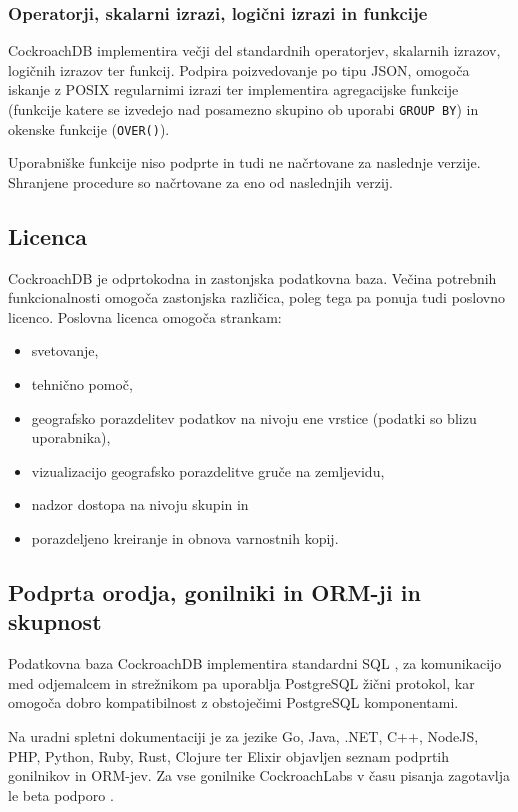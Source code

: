 \documentclass[a4paper, 12pt]{book}
\begin{document}
\subsubsection{Operatorji, skalarni izrazi, logični izrazi in funkcije}
CockroachDB implementira večji del standardnih operatorjev, skalarnih izrazov, logičnih izrazov ter funkcij. Podpira poizvedovanje po tipu JSON, omogoča iskanje z POSIX regularnimi izrazi ter implementira agregacijske funkcije (funkcije katere se izvedejo nad posamezno skupino ob uporabi \texttt{GROUP BY}) in okenske funkcije (\texttt{OVER()}).

Uporabniške funkcije niso podprte in tudi ne načrtovane za naslednje verzije. Shranjene procedure so načrtovane za eno od naslednjih verzij.

\subsection{Licenca}

CockroachDB je odprtokodna in zastonjska podatkovna baza. Večina potrebnih funkcionalnosti omogoča zastonjska različica, poleg tega pa ponuja tudi poslovno licenco. Poslovna licenca omogoča strankam:

\begin{itemize}
    \item svetovanje,
    \item tehnično pomoč,
    \item geografsko porazdelitev podatkov na nivoju ene vrstice (podatki so blizu uporabnika), 
    \item vizualizacijo geografsko porazdelitve gruče na zemljevidu,
    \item nadzor dostopa na nivoju skupin in
    \item porazdeljeno kreiranje in obnova varnostnih kopij.
\end{itemize}

\subsection{Podprta orodja, gonilniki in ORM-ji in skupnost}

Podatkovna baza CockroachDB implementira standardni SQL \cite{CRDB-sql-standard}, za komunikacijo med odjemalcem in strežnikom pa uporablja PostgreSQL žični protokol, kar omogoča dobro kompatibilnost z obstoječimi PostgreSQL komponentami.

Na uradni spletni dokumentaciji je za jezike Go, Java, .NET, C++, NodeJS, PHP, Python, Ruby, Rust, Clojure ter Elixir objavljen seznam podprtih gonilnikov in ORM-jev. Za vse gonilnike CockroachLabs v času pisanja zagotavlja le beta podporo \cite{CRDB-meta-drivers-orms}.
\end{document}
